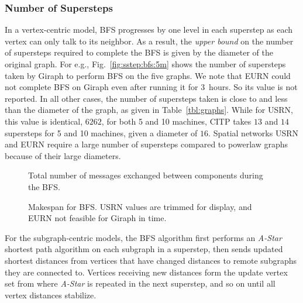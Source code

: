 \documentclass[10pt,conference, compsocconf]{IEEEtran}
\begin{document}
\subsubsection{Number of Supersteps}
In a vertex-centric model, BFS progresses by one level in each superstep as each vertex can only talk to its neighbor. As a result, the \emph{upper bound} on the number of supersteps required to complete the BFS is given by the diameter of the original graph. For e.g., Fig.~\ref{fig:sstep:bfs:5m} shows the number of supersteps taken by Giraph to perform BFS on the five graphs. We note that EURN could not complete BFS on Giraph even after running it for {3~hours}. So its value is not reported. In all other cases, the number of supersteps taken is close to and less than the diameter of the graph, as given in Table~\ref{tbl:graphs}. While for USRN, this value is identical, $6262$, for both 5 and 10 machines, CITP takes $13$ and $14$ supersteps for 5 and 10 machines, given a diameter of $16$. Spatial networks USRN and EURN require a large number of supersteps compared to powerlaw graphs because of their large diameters.

\begin{figure*}[!t]
\centering {}
\caption{Total number of messages exchanged between components during the BFS.}
\label{fig:msgs:bfs}
\vspace{-0.1in}
\end{figure*}

\begin{figure*}[!ht]
\centering {}
\caption{Makespan for BFS. USRN values are trimmed for display, and EURN not feasible for Giraph in time.}
\label{fig:makespan-SSSP}
\vspace{-0.1in}
\end{figure*}
For the subgraph-centric models, the BFS algorithm first performs an \emph{A-Star}~\cite{astar,goffish} shortest path algorithm on each subgraph in a superstep, then sends updated shortest distances from vertices that have changed distances to remote subgraphs they are connected to. Vertices receiving new distances form the update vertex set from where \emph{A-Star} is repeated in the next superstep, and so on until all vertex distances stabilize.
\end{document}
